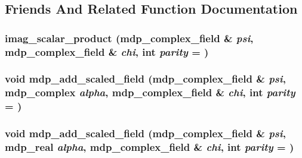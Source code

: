 \subsection{Friends And Related Function Documentation}
\hypertarget{classmdp__complex__field_a0671bd0b418f625c07f3ba9135e26b12}{
\subsubsection[{imag\_\-scalar\_\-product}]{ imag\_\-scalar\_\-product ({\bf mdp\_\-complex\_\-field} \& {\em psi}, \/  {\bf mdp\_\-complex\_\-field} \& {\em chi}, \/  int {\em parity} = {})}}
\label{classmdp__complex__field_a0671bd0b418f625c07f3ba9135e26b12}
\hypertarget{classmdp__complex__field_aeb331a3604fa5d1e30e726958e2cc21f}{
\subsubsection[{mdp\_\-add\_\-scaled\_\-field}]{\setlength{\rightskip}{0pt plus 5cm}void mdp\_\-add\_\-scaled\_\-field ({\bf mdp\_\-complex\_\-field} \& {\em psi}, \/  {\bf mdp\_\-complex} {\em alpha}, \/  {\bf mdp\_\-complex\_\-field} \& {\em chi}, \/  int {\em parity} = {})}}
\label{classmdp__complex__field_aeb331a3604fa5d1e30e726958e2cc21f}
\hypertarget{classmdp__complex__field_adebe165924543c988d0c7e86da4b2eb3}{
\subsubsection[{mdp\_\-add\_\-scaled\_\-field}]{\setlength{\rightskip}{0pt plus 5cm}void mdp\_\-add\_\-scaled\_\-field ({\bf mdp\_\-complex\_\-field} \& {\em psi}, \/  {\bf mdp\_\-real} {\em alpha}, \/  {\bf mdp\_\-complex\_\-field} \& {\em chi}, \/  int {\em parity} = {})}}
